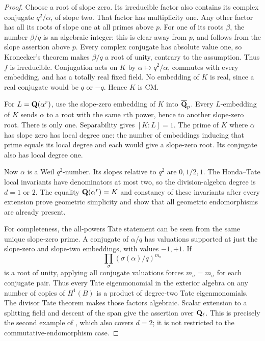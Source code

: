 \begin{proof}
Choose a root of slope zero. Its irreducible factor also contains
its complex conjugate $q^2/\alpha$, of slope two. That factor has
multiplicity one. Any other factor has all its roots of slope one
at all primes above $p$. For one of its roots $\beta$, the number
$\beta/q$ is an algebraic integer: this is clear away from $p$,
and follows from the slope assertion above $p$. Every complex
conjugate has absolute value one, so Kronecker's theorem makes
$\beta/q$ a root of unity, contrary to the assumption. Thus $f$
is irreducible. Conjugation acts on $K$ by
$\alpha\mapsto q^2/\alpha$, commutes with every embedding, and
has a totally real fixed field. No embedding of $K$ is real,
since a real conjugate would be $q$ or $-q$. Hence $K$ is CM.

For $L=\mathbf Q(\alpha^r)$, use the slope-zero embedding of $K$ into
$\overline{\mathbf Q}_p$. Every $L$-embedding of $K$ sends $\alpha$ to a
root with the same $r$th power, hence to another slope-zero root.
There is only one. Separability gives $[K:L]=1$.
The prime of $K$ where $\alpha$ has slope zero has local degree
one: the number of embeddings inducing that prime equals its local
degree and each would give a slope-zero root. Its conjugate also
has local degree one.

Now $\alpha$ is a Weil $q^2$-number. Its slopes relative to $q^2$
are $0,1/2,1$. The Honda--Tate local invariants have denominators
at most two, so the division-algebra degree is $d=1$ or $2$.
The equality $\mathbf Q(\alpha^r)=K$ and constancy of these invariants
after every extension prove geometric simplicity and show that
all geometric endomorphisms are already present.

For completeness, the all-powers Tate statement can be seen from
the same unique slope-zero prime. A conjugate of $\alpha/q$ has
valuations supported at just the slope-zero and slope-two
embeddings, with values $-1,+1$. If
\[
        \prod_\sigma (\sigma(\alpha)/q)^{m_\sigma}
\]
is a root of unity, applying all conjugate valuations forces
$m_\sigma=m_{\bar\sigma}$ for each conjugate pair. Thus every
Tate eigenmonomial in the exterior algebra on any number of copies
of $H^1(B)$ is a product of degree-two Tate eigenmonomials.
The divisor Tate theorem makes those factors algebraic. Scalar
extension to a splitting field and descent of the span give the
assertion over $\mathbf Q_\ell$. This is precisely the second example of
\citet[Appendix A.7, p.~159]{Milne2001}, which also covers $d=2$;
it is not restricted to the commutative-endomorphism case.


\end{proof}
